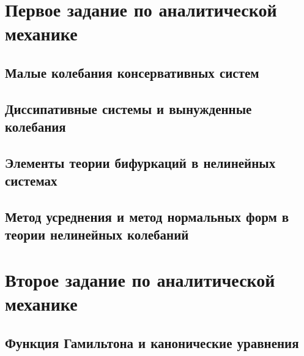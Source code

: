 



\section{Первое задание по аналитической механике}


\subsection{Малые колебания консервативных систем}


\newpage

\subsection{Диссипативные системы и вынужденные колебания}


\newpage

\subsection{Элементы теории бифуркаций в нелинейных системах}


\newpage

\subsection{Метод усреднения и метод нормальных форм в теории нелинейных колебаний}


% 

% 

\newpage
\section{Второе задание по аналитической механике}

\subsection{Функция Гамильтона и канонические уравнения}


% 

